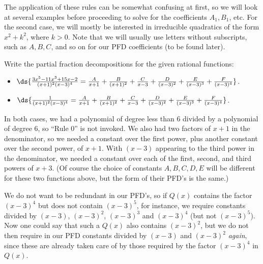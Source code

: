 The application of these rules can be somewhat confusing at first,
so we will look at several examples before proceeding to 
solve for the coefficients $A_1, B_1$, etc.  
For the second case, we will mostly be interested in 
irreducible quadratics of the form $x^2+k^2$, where $k>0$.
Note that
we will usually use letters without subscripts, such as
$A,B,C$, and so on for our PFD coefficients (to be found later).

\bex Write the partial fraction decompositions for the given 
rational functions:
\begin{itemize}
\item $\ds{\frac{3x^5-11x^3+15x-2}{(x+1)^2(x-3)^4}
  =\frac{A}{x+1}+\frac{B}{(x+1)^2}+\frac{C}{x-3}
    +\frac{D}{(x-3)^2}+\frac{E}{(x-3)^3}+\frac{F}{(x-3)^4}}$.
\item $\ds{\frac1{(x+1)^2(x-3)^4}
=\frac{A}{x+1}+\frac{B}{(x+1)^2}+\frac{C}{x-3}
    +\frac{D}{(x-3)^2}+\frac{E}{(x-3)^3}+\frac{F}{(x-3)^4}}$.
\end{itemize}
In both cases, we had a polynomial of degree less than
6 divided by a polynomial of degree 6, so ``Rule 0''
is not invoked.  We also had two factors of $x+1$
in the denominator, so we needed a constant over the
first power, plus another constant over the second power,
of $x+1$.  With $(x-3)$ appearing to the third power in 
the denominator, we needed a constant over each of the
first, second, and third powers of $x+3$. (Of course the
choice of constants  $A,B,C,D,E$ will be different for these
two functions above, but the form of their PFD's is the same.) 
\eex

We do not want to be redundant in our PFD's, so if $Q(x)$
contains the factor $(x-3)^4$ but does not contain $(x-3)^5$,
for instance, we require constants divided by
$(x-3)$, $(x-3)^2$, $(x-3)^3$ and $(x-3)^4$ (but not $(x-3)^5$).
Now one could say that
such a $Q(x)$ also contains $(x-3)^2$, but we do not then
require in our PFD constants divided by $(x-3)$ and $(x-3)^2$ {\it again},
since these are already taken care of by those required by
the factor $(x-3)^4$ in $Q(x)$.

